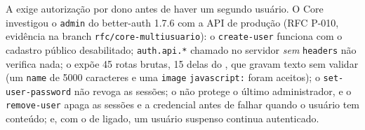 {A  exige autorização por dono antes de haver um segundo usuário. O Core investigou o  \texttt{admin} do better-auth 1.7.6 com a API de produção (RFC P-010, evidência na branch \texttt{rfc/core-multiusuario}): o \texttt{create-user} funciona com o cadastro público desabilitado; \texttt{auth.api.*} chamado no servidor \emph{sem} \texttt{headers} não verifica nada; o   expõe 45 rotas brutas, 15 delas do , que gravam texto sem validar (um \texttt{name} de 5000 caracteres e uma \texttt{image} \texttt{javascript:} foram aceitos); o \texttt{set-user-password} não revoga as sessões; o  não protege o último administrador, e o \texttt{remove-user} apaga as sessões e a credencial antes de falhar quando o usuário tem conteúdo; e, com o  de  ligado, um usuário suspenso continua autenticado.}
